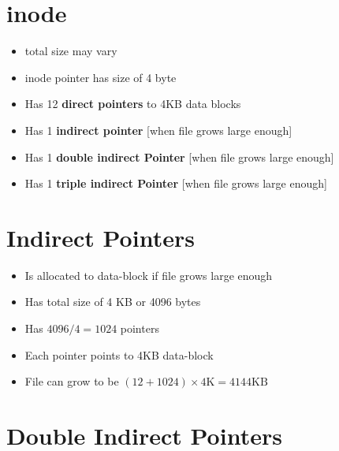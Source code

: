 \documentclass[12pt]{article}
\begin{document}
\section{inode}

\begin{itemize}
    \item total size may vary
    \item inode pointer has size of 4 byte
    \item Has 12 \textbf{direct pointers} to 4KB data blocks
    \item Has 1 \textbf{indirect pointer} [when file grows large enough]
    \item Has 1 \textbf{double indirect Pointer} [when file grows large enough]
    \item Has 1 \textbf{triple indirect Pointer} [when file grows large enough]
\end{itemize}

\section{Indirect Pointers}

\begin{itemize}
    \item Is allocated to data-block if file grows large enough
    \item Has total size of 4 KB or 4096 bytes
    \item Has $4096/4 = 1024$ pointers
    \item Each pointer points to 4KB data-block
    \item File can grow to be $(12 + 1024) \times 4\text{K} = 4144\text{KB}$
\end{itemize}

\section{Double Indirect Pointers}
\end{document}
